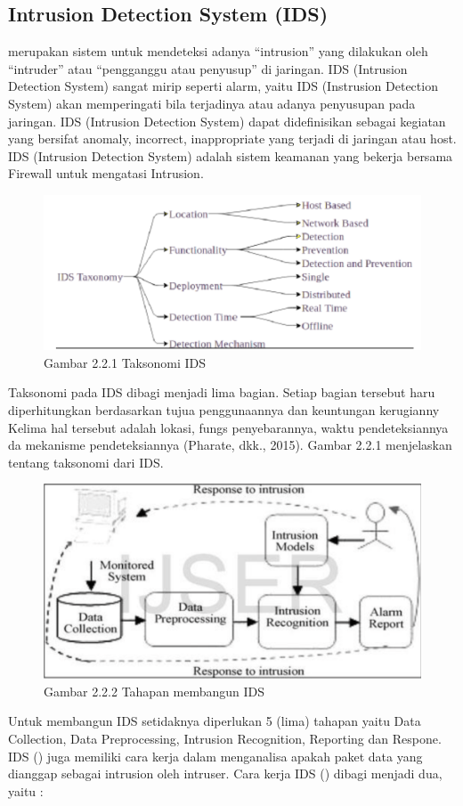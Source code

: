 \documentclass[conference]{IEEEtran}
\begin{document}
\subsection{Intrusion Detection System (IDS)}
merupakan sistem untuk mendeteksi adanya “intrusion” yang dilakukan oleh “intruder” atau “pengganggu atau penyusup” di jaringan. IDS (Intrusion Detection System) sangat mirip seperti alarm, yaitu IDS (Instrusion Detection System) akan memperingati bila terjadinya atau adanya penyusupan pada jaringan. IDS (Intrusion Detection System) dapat didefinisikan sebagai kegiatan yang bersifat anomaly, incorrect, inappropriate yang terjadi di jaringan atau host. IDS (Intrusion Detection System) adalah sistem keamanan yang bekerja bersama Firewall untuk mengatasi Intrusion.

\begin{figure}
\centering
\includegraphics[width=.4\textwidth]{picture/Gambar 2.2.1.PNG}
\caption{Gambar 2.2.1 Taksonomi IDS}
\end{figure}

Taksonomi pada IDS dibagi menjadi lima bagian. Setiap bagian tersebut haru diperhitungkan berdasarkan tujua penggunaannya dan keuntungan kerugianny Kelima hal tersebut adalah lokasi, fungs penyebarannya, waktu pendeteksiannya da mekanisme pendeteksiannya (Pharate, dkk., 2015). Gambar 2.2.1 menjelaskan tentang taksonomi dari IDS.

\begin{figure}
\centering
\includegraphics[width=.4\textwidth]{picture/Gambar 2.2.2.PNG}
\caption{Gambar 2.2.2 Tahapan membangun IDS}
\end{figure}

Untuk membangun IDS setidaknya diperlukan 5 (lima) tahapan yaitu Data Collection, Data Preprocessing, Intrusion Recognition, Reporting dan Respone. IDS () juga memiliki cara kerja dalam menganalisa apakah paket data yang dianggap sebagai intrusion oleh intruser. Cara kerja IDS () dibagi menjadi dua, yaitu :
\end{document}
